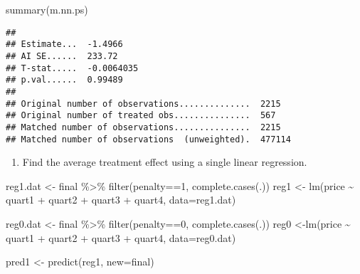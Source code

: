 \documentclass[
]{article}
\newenvironment{Shaded}{\begin{snugshade}}{\end{snugshade}}
\newcommand{\AttributeTok}[1]{\textcolor[rgb]{0.77,0.63,0.00}{#1}}
\newcommand{\DecValTok}[1]{\textcolor[rgb]{0.00,0.00,0.81}{#1}}
\newcommand{\FunctionTok}[1]{\textcolor[rgb]{0.00,0.00,0.00}{#1}}
\newcommand{\NormalTok}[1]{#1}
\newcommand{\OtherTok}[1]{\textcolor[rgb]{0.56,0.35,0.01}{#1}}
\newcommand{\SpecialCharTok}[1]{\textcolor[rgb]{0.00,0.00,0.00}{#1}}
\providecommand{\tightlist}{%
  \setlength{\itemsep}{0pt}\setlength{\parskip}{0pt}}
\begin{document}
\begin{Shaded}
\begin{Highlighting}[]
\FunctionTok{summary}\NormalTok{(m.nn.ps)}
\end{Highlighting}
\end{Shaded}

\begin{verbatim}
## 
## Estimate...  -1.4966 
## AI SE......  233.72 
## T-stat.....  -0.0064035 
## p.val......  0.99489 
## 
## Original number of observations..............  2215 
## Original number of treated obs...............  567 
## Matched number of observations...............  2215 
## Matched number of observations  (unweighted).  477114
\end{verbatim}

\begin{enumerate}
\def\labelenumi{\arabic{enumi}.}
\setcounter{enumi}{5}
\tightlist
\item
  Find the average treatment effect using a single linear regression.
\end{enumerate}

\begin{Shaded}
\begin{Highlighting}[]
\NormalTok{reg1.dat }\OtherTok{\textless{}{-}}\NormalTok{ final }\SpecialCharTok{\%\textgreater{}\%} \FunctionTok{filter}\NormalTok{(penalty}\SpecialCharTok{==}\DecValTok{1}\NormalTok{, }\FunctionTok{complete.cases}\NormalTok{(.))}
\NormalTok{reg1 }\OtherTok{\textless{}{-}} \FunctionTok{lm}\NormalTok{(price }\SpecialCharTok{\textasciitilde{}}\NormalTok{ quart1 }\SpecialCharTok{+}\NormalTok{ quart2 }\SpecialCharTok{+}\NormalTok{ quart3 }\SpecialCharTok{+}\NormalTok{ quart4, }\AttributeTok{data=}\NormalTok{reg1.dat)}

\NormalTok{reg0.dat }\OtherTok{\textless{}{-}}\NormalTok{ final }\SpecialCharTok{\%\textgreater{}\%} \FunctionTok{filter}\NormalTok{(penalty}\SpecialCharTok{==}\DecValTok{0}\NormalTok{, }\FunctionTok{complete.cases}\NormalTok{(.))}
\NormalTok{reg0 }\OtherTok{\textless{}{-}}\FunctionTok{lm}\NormalTok{(price }\SpecialCharTok{\textasciitilde{}}\NormalTok{ quart1 }\SpecialCharTok{+}\NormalTok{ quart2 }\SpecialCharTok{+}\NormalTok{ quart3 }\SpecialCharTok{+}\NormalTok{ quart4, }\AttributeTok{data=}\NormalTok{reg0.dat)}

\NormalTok{pred1 }\OtherTok{\textless{}{-}} \FunctionTok{predict}\NormalTok{(reg1, }\AttributeTok{new=}\NormalTok{final)}
\end{Highlighting}
\end{Shaded}
\end{document}

